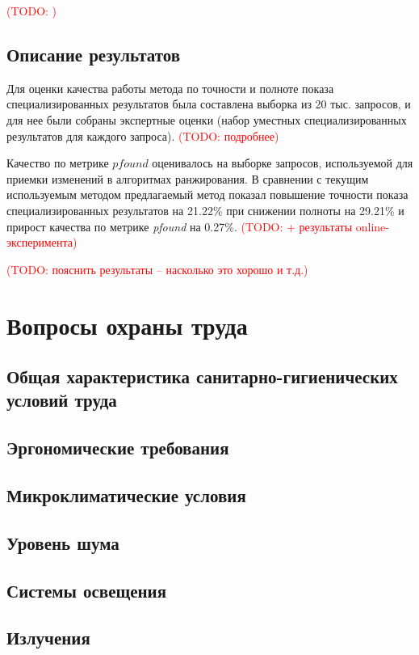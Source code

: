 \documentclass[12pt,a4paper]{report}
\newcommand\note[1]{\textcolor{red}{(#1)}}
\newcommand\todonote[1]{\note{TODO: #1}}
\begin{document}
\todonote{}

\section{Описание результатов}

Для оценки качества работы метода по точности и полноте показа специализированных результатов была составлена выборка из 20 тыс. запросов, и для нее были собраны экспертные оценки (набор уместных специализированных результатов для каждого запроса). 
\todonote{подробнее}

Качество по метрике $pfound$ оценивалось на выборке запросов, используемой для приемки изменений в алгоритмах ранжирования.
В сравнении с текущим используемым методом предлагаемый метод показал повышение точности показа специализированных результатов на 21.22\% при снижении полноты на 29.21\% и прирост качества по метрике \textit{pfound} на 0.27\%. \todonote{+ результаты online-эксперимента}


\todonote{пояснить результаты -- насколько это хорошо и т.д.}

\chapter{Вопросы охраны труда}

\section{Общая характеристика санитарно-гигиенических условий труда}
\section{Эргономические требования}
\section{Микроклиматические условия}
\section{Уровень шума}
\section{Системы освещения}
\section{Излучения}
\end{document}
